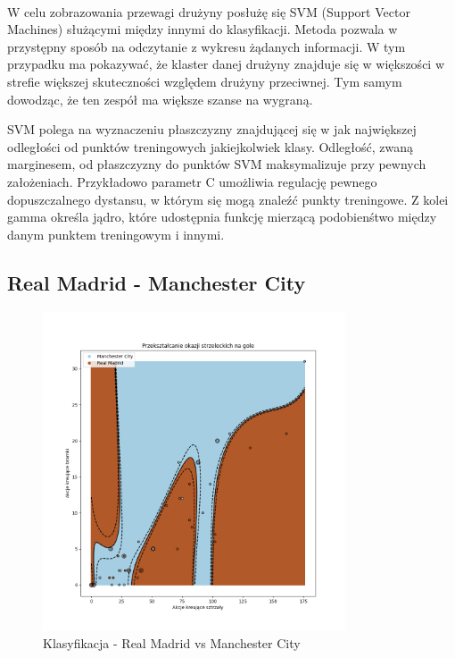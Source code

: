 \documentclass[12pt, letterpaper]{article}
\begin{document}
\paragraph{} W celu zobrazowania przewagi drużyny posłużę się SVM (Support Vector Machines) służącymi między innymi do klasyfikacji. Metoda pozwala w przystępny sposób na odczytanie z wykresu żądanych informacji. W tym przypadku ma pokazywać, że klaster danej drużyny znajduje się w większości w strefie większej skuteczności względem drużyny przeciwnej. Tym samym dowodząc, że ten zespół ma większe szanse na wygraną.
\par SVM polega na wyznaczeniu płaszczyzny znajdującej się w jak największej odległości od punktów treningowych jakiejkolwiek klasy. Odległość, zwaną marginesem, od płaszczyzny do punktów SVM maksymalizuje przy pewnych założeniach.
Przykładowo parametr C umożliwia regulację pewnego dopuszczalnego dystansu, w którym się mogą znaleźć punkty treningowe. Z kolei gamma określa jądro, które udostępnia funkcję mierzącą podobienśtwo między danym punktem treningowym i innymi.
\pagebreak
\subsection{Real Madrid - Manchester City}
\begin{figure}[ht]
    \centering
    \includegraphics[width=0.8\textwidth]{images/06707506ManReal.png}
    \caption{Klasyfikacja - Real Madrid vs Manchester City}
    \label{fig:enter-label}
\end{figure}
\end{document}
